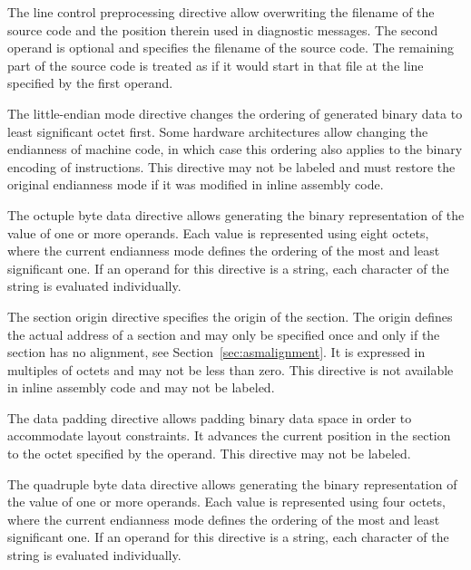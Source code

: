 
The line control preprocessing directive allow overwriting the filename of the source code and the position therein used in diagnostic messages.
The second operand is optional and specifies the filename of the source code.
The remaining part of the source code is treated as if it would start in that file at the line specified by the first operand.


The little-endian mode directive changes the ordering of generated binary data to least significant octet first.
Some hardware architectures allow changing the endianness of machine code, in which case this ordering also applies to the binary encoding of instructions.
This directive may not be labeled and must restore the original endianness mode if it was modified in inline assembly code.


The octuple byte data directive allows generating the binary representation of the value of one or more operands.
Each value is represented using eight octets, where the current endianness mode defines the ordering of the most and least significant one.
If an operand for this directive is a string, each character of the string is evaluated individually.


The section origin directive specifies the origin of the section.
The origin defines the actual address of a section and may only be specified once and only if the section has no alignment, see Section~\ref{sec:asmalignment}.
It is expressed in multiples of octets and may not be less than zero.
This directive is not available in inline assembly code and may not be labeled.


The data padding directive allows padding binary data space in order to accommodate layout constraints.
It advances the current position in the section to the octet specified by the operand.
This directive may not be labeled.


The quadruple byte data directive allows generating the binary representation of the value of one or more operands.
Each value is represented using four octets, where the current endianness mode defines the ordering of the most and least significant one.
If an operand for this directive is a string, each character of the string is evaluated individually.

